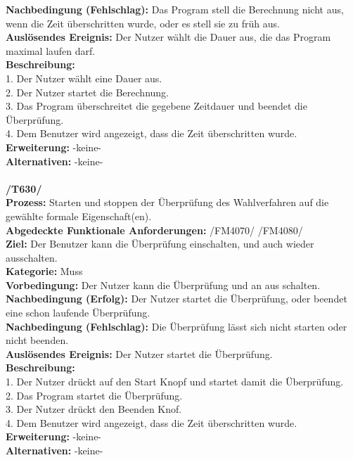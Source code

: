 \documentclass[a4paper]{scrreprt}
\begin{document}
\textbf{Nachbedingung (Fehlschlag):} Das Program stell die Berechnung nicht
aus, wenn die Zeit überschritten wurde, oder es stell sie zu früh aus.\\
\textbf{Auslösendes Ereignis:} Der Nutzer wählt die Dauer aus, die das Program
maximal laufen darf.\\
\textbf{Beschreibung:} \\
1. Der Nutzer wählt eine Dauer aus.\\
2. Der Nutzer startet die Berechnung.\\
3. Das Program überschreitet die gegebene Zeitdauer und beendet die
Überprüfung.\\
4. Dem Benutzer wird angezeigt, dass die Zeit überschritten wurde.\\
\textbf {Erweiterung:}  -keine- \\
\textbf {Alternativen:} -keine- \\ \\
\textbf{/T630/}\\
\textbf{Prozess:} Starten und stoppen der Überprüfung des Wahlverfahren auf die gewählte formale Eigenschaft(en).\\
\textbf{Abgedeckte Funktionale Anforderungen:} /FM4070/ /FM4080/\\
\textbf{Ziel:} Der Benutzer kann die Überprüfung einschalten, und auch wieder
ausschalten.\\
\textbf{Kategorie:} Muss\\
\textbf{Vorbedingung:} Der Nutzer kann die Überprüfung und an aus schalten.\\
\textbf{Nachbedingung (Erfolg):} Der Nutzer startet die Überprüfung, oder
beendet eine schon laufende Überprüfung.\\
\textbf{Nachbedingung (Fehlschlag):} Die Überprüfung lässt sich nicht
starten oder nicht beenden.\\
\textbf{Auslösendes Ereignis:} Der Nutzer startet die Überprüfung.\\
\textbf{Beschreibung:} \\
1. Der Nutzer drückt auf den Start Knopf und startet damit die Überprüfung.\\
2. Das Program startet die Überprüfung.\\
3. Der Nutzer drückt den Beenden Knof.\\
4. Dem Benutzer wird angezeigt, dass die Zeit überschritten wurde.\\
\textbf {Erweiterung:}  -keine- \\
\textbf {Alternativen:} -keine- \\ \\
\end{document}

